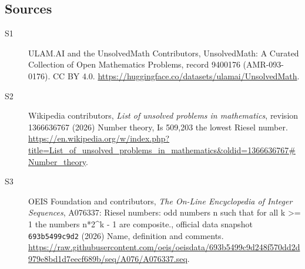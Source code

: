 \documentclass[11pt]{article}
\begin{document}
\subsection{Sources}
\begin{description}
\item[\hypertarget{source:9400176:1}{S1}] ULAM.AI and the UnsolvedMath Contributors, UnsolvedMath: A Curated Collection of Open Mathematics Problems, record 9400176 (AMR-093-0176). CC BY 4.0. \url{https://huggingface.co/datasets/ulamai/UnsolvedMath}.
\item[\hypertarget{source:9400176:2}{S2}] Wikipedia contributors, \emph{List of unsolved problems in mathematics}, revision 1366636767 (2026) Number theory, Is 509,203 the lowest Riesel number. \url{https://en.wikipedia.org/w/index.php?title=List_of_unsolved_problems_in_mathematics&oldid=1366636767#Number_theory}.
\item[\hypertarget{source:9400176:3}{S3}] OEIS Foundation and contributors, \emph{The On-Line Encyclopedia of Integer Sequences}, A076337: Riesel numbers: odd numbers n such that for all k >= 1 the numbers n*2\textasciicircum{}k - 1 are composite., official data snapshot \texttt{693b5499c9d2} (2026) Name, definition and comments. \url{https://raw.githubusercontent.com/oeis/oeisdata/693b5499c9d248f570dd2d979e8bd1d7eecf689b/seq/A076/A076337.seq}.
\end{description}
\label{end:9400176}
\end{document}
